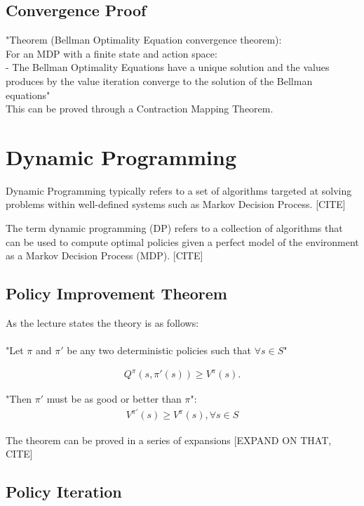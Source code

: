 \subsection{Convergence Proof}
"Theorem (Bellman Optimality Equation convergence theorem):\\

For an MDP with a finite state and action space:\\
 - The Bellman Optimality Equations have a unique solution and the values produces by the value iteration converge to the solution of  the Bellman equations"\\
 
 This can be proved through a Contraction Mapping Theorem.

\section{Dynamic Programming}
Dynamic Programming typically refers to a set of algorithms targeted at solving problems within well-defined systems such as Markov Decision Process. [CITE] 

The term dynamic programming (DP) refers to a collection of algorithms that can be used to compute optimal policies given a perfect model of the environment as a Markov Decision Process (MDP). [CITE]

\subsection{Policy Improvement Theorem}

As the lecture states the theory is as follows:\\\\

"Let $\pi$ and $\pi'$ be any two deterministic policies such that $\forall s \in S$"

\begin{align}
    Q^{\pi}(s, \pi'(s)) \geq V^{\pi}(s).
\end{align}

"Then $\pi'$ must be as good or better than $\pi$":
\begin{align}
    V^{\pi'}(s) \geq V^{\pi}(s), \forall s \in S
\end{align}

The theorem can be proved in a series of expansions [EXPAND ON THAT, CITE]

\subsection{Policy Iteration}

